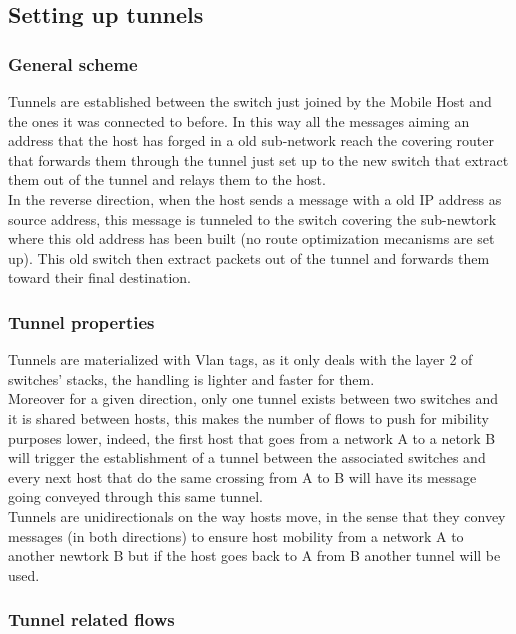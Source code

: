 \documentclass{article}
\begin{document}
\subsection{Setting up tunnels}

\subsubsection{General scheme}
Tunnels are established between the switch just joined by the Mobile
Host and the ones it was connected to before. In this way all the
messages aiming an address that the host has forged in a old
sub-network reach the covering router that forwards them through the
tunnel just set up to the new switch that extract them out of the
tunnel and relays them to the host.\\ 
\newline
In the reverse direction, when the host sends a message with a old IP
address as source address, this message is tunneled to the switch
covering the sub-newtork where this old address has been built (no
route optimization mecanisms are set up). This old switch then extract
packets out of the tunnel and forwards them toward their final destination.

\subsubsection{Tunnel properties}

Tunnels are materialized with Vlan tags, as it only deals with the
layer 2 of switches' stacks, the handling is lighter and faster for
them.\\ 
\newline
Moreover for a given direction, only one tunnel exists between
two switches and it is shared between hosts, this makes the number of
flows to push for mibility purposes lower, indeed, the first host that
goes from a network A to a netork B will trigger the establishment of
a tunnel between the associated switches and every next host that do
the same crossing from A to B will have its message going conveyed
through this same tunnel.\\ 
\newline
Tunnels are unidirectionals on the way hosts move, in the sense that
they convey messages (in both directions) to ensure host mobility from
a network A to another newtork B but if the host goes back to A from B
another tunnel will be used.

\subsubsection{Tunnel related flows}
\end{document}
